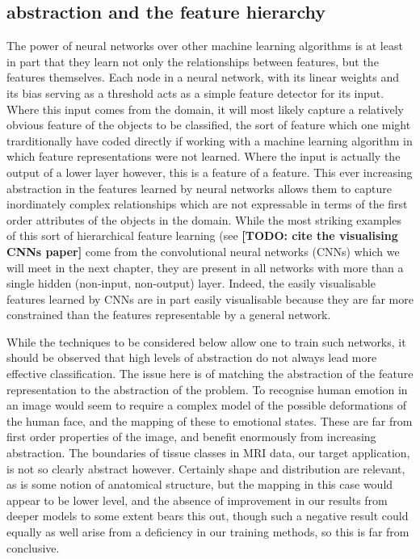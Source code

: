 \documentclass[msc]{infthesis}
\newcommand{\TODO}[1]{\textbf{[TODO: {#1}]}}
\begin{document}
\subsection{abstraction and the feature hierarchy}
\label{sec:classification:deep:abstraction}

The power of neural networks over other machine learning algorithms is at least in part that they
learn not only the relationships between features, but the features themselves.
%
Each node in a neural network, with its linear weights and its bias serving as a threshold acts as
a simple feature detector for its input.  Where this input comes from the domain, it will most
likely capture a relatively obvious feature of the objects to be classified, the sort of feature
which one might trarditionally have coded directly if working with a machine learning algorithm
in which feature representations were not learned.  Where the input is actually the output of a
lower layer however, this is a feature of a feature.  This ever increasing abstraction in the
features learned by neural networks allows them to capture inordinately complex relationships
which are not expressable in terms of the first order attributes of the objects in the domain.
%
While the most striking examples of this sort of hierarchical feature learning (see \TODO{cite
the visualising CNNs paper} come from the convolutional neural networks (CNNs) which we will
meet in the next chapter, they are present in all networks with more than a single hidden
(non-input, non-output) layer.  Indeed, the easily visualisable features learned by CNNs are in
part easily visualisable because they are far more constrained than the features representable
by a general network.

While the techniques to be considered below allow one to train such networks, it should be observed
that high levels of abstraction do not always lead more effective classification.  The issue here
is of matching the abstraction of the feature representation to the abstraction of the problem.
To recognise human emotion in an image would seem to require a complex model of the possible
deformations of the human face, and the mapping of these to emotional states.  These are far from
first order properties of the image, and benefit enormously from increasing abstraction.  The
boundaries of tissue classes in MRI data, our target application, is not so clearly abstract
however.  Certainly shape and distribution are relevant, as is some notion of anatomical structure,
but the mapping in this case would appear to be lower level, and the absence of improvement in
our results from deeper models to some extent bears this out, though such a negative result could
equally as well arise from a deficiency in our training methods, so this is far from conclusive.
\end{document}
